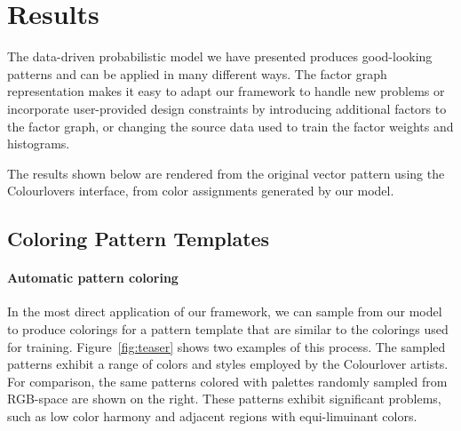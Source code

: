 \section{Results}
\label{sec:results}

The data-driven probabilistic model we have presented produces good-looking patterns and can be applied in many different ways. The factor graph representation makes it easy to adapt our framework to handle new problems or incorporate user-provided design constraints by introducing additional factors to the factor graph, or changing the source data used to train the factor weights and histograms.


The results shown below are rendered from the original vector pattern using the Colourlovers interface, from color assignments generated by our model. 

\subsection{Coloring Pattern Templates}

\paragraph{Automatic pattern coloring} In the most direct application of our framework, we can sample from our model to produce colorings for a pattern template that are similar to the colorings used for training. Figure~\ref{fig:teaser} shows two examples of this process. The sampled patterns exhibit a range of colors and styles employed by the Colourlover artists. For comparison, the same patterns colored with palettes randomly sampled from RGB-space are shown on the right. These patterns exhibit significant problems, such as low color harmony and adjacent regions with equi-limuinant colors.

